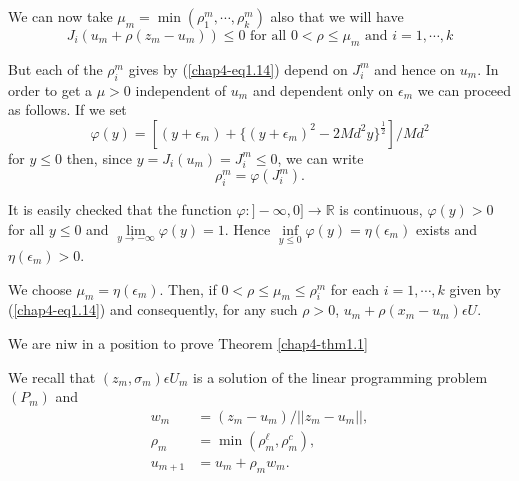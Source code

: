 We can now take $\mu_{m} = \min (\rho_{1}^{m}, \cdots, \rho_{k}^{m})$ also that we will have
$$
J_{i}(u_{m} + \rho(z_{m}-u_{m})) \leq 0 \text{ for all } 0 < \rho \leq \mu_{m} \text{ and } i = 1, \cdots, k
$$

But each of the $\rho_{i}^{m}$ gives by (\ref{chap4-eq1.14}) depend on $J_{i}^{m}$ and hence on $u_{m}$. In order to get a $\mu > 0$ independent of $u_{m}$ and dependent only on $\epsilon_{m}$ we can proceed as follows. If we set
\begin{equation*}
\varphi(y) = [(y + \epsilon_{m}) + \{(y+\epsilon_{m})^{2} - 2Md^{2} y\}^{\frac{1}{2}}]/ Md^{2}\tag{1.15}\label{chap4-eq1.15}
\end{equation*}
for $y \leq 0$ then, since $y = J_{i}(u_{m}) = J_{i}^{m} \leq 0$, we can write
$$
\rho_{i}^{m} = \varphi (J_{i}^{m}).
$$

It is easily checked that the function $\varphi : ]-\infty, 0] \to \mathbb{R}$ is continuous, $\varphi(y) > 0$ for all $y \leq 0$ and $\lim\limits_{y \to -\infty} \varphi(y) = 1$. Hence $\inf\limits_{y \leq 0} \varphi(y) = \eta(\epsilon_{m})$ exists and $\eta(\epsilon_{m}) > 0$.\pageoriginale

We choose $\mu_{m} = \eta(\epsilon_{m})$. Then, if $0 < \rho \leq \mu_{m} \leq \rho_{i}^{m}$ for each $i=1, \cdots, k$ given by (\ref{chap4-eq1.14}) and consequently, for any such $\rho > 0$, $u_{m} + \rho(x_{m}-u_{m}) \epsilon U$.

We are niw in a position to prove Theorem \ref{chap4-thm1.1}

\medskip
{} We recall that $(z_{m}, \sigma_{m}) \epsilon U_{m}$ is a solution of the linear programming problem $(P_{m})$ and 
\begin{align*}
w_{m} & = (z_{m}-u_{m})/ ||z_{m}-u_{m}||,\\
\rho_{m} & = \min (\rho_{m}^{\ell}, \rho_{m}^{c}),\\
u_{m+1} & = u_{m} + \rho_{m} w_{m}.
\end{align*}

